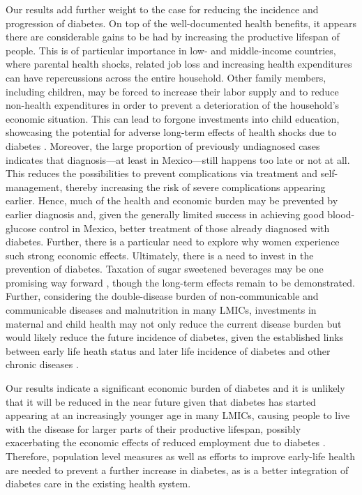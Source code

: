 \documentclass[12pt,english]{article}
\begin{document}
Our results add further weight to the case for reducing the incidence and progression of diabetes. On top of the well-documented health benefits, it appears there are considerable gains to be had by increasing the productive lifespan of people. This is of particular
importance in low- and middle-income countries, where parental health shocks, related job loss and increasing health expenditures can have repercussions across the entire household. Other family members, including children, may be forced to increase their labor supply and
to reduce non-health expenditures in order to prevent a deterioration of the household's economic situation. This can lead to forgone investments into child education, showcasing the potential for adverse long-term effects of health shocks due to diabetes \parencite{Bratti2014}. Moreover, the large proportion of previously undiagnosed cases indicates that diagnosis---at least in Mexico---still happens too late or not at all. This reduces the possibilities to prevent complications via treatment and self-management, thereby increasing the risk of severe complications appearing earlier. Hence, much of the health and economic burden may be prevented by earlier diagnosis and, given the generally limited success in achieving good blood-glucose control in Mexico, better treatment of those already diagnosed with diabetes. Further, there is a particular need to explore why women experience such strong economic effects. Ultimately, there is a need to invest in the prevention of diabetes. Taxation of sugar sweetened beverages may be one promising way forward \parencite{Colchero2016}, though the long-term effects remain to be demonstrated. Further, considering the double-disease burden of non-communicable and communicable diseases and malnutrition in many \acl{LMICs}, investments in maternal and child health may not only reduce the current disease burden but would likely reduce the future incidence of diabetes, given the established links between early life heath status and later life incidence of diabetes and other chronic diseases \parencite{Sotomayor2013,Hanson2012,Li2010b}.  

Our results indicate a significant economic burden of diabetes and it is unlikely that it will be reduced in the near future given that diabetes has started appearing at an increasingly younger age in many \ac{LMICs}, causing people to live with the disease for larger parts of their productive lifespan, possibly exacerbating the economic effects of reduced employment due to diabetes \parencite{Hu2011,Villalpando2010}. Therefore, population level measures as well as efforts to improve early-life health are needed to prevent a further increase in diabetes, as is a better integration of diabetes care in the existing health system.
\end{document}
